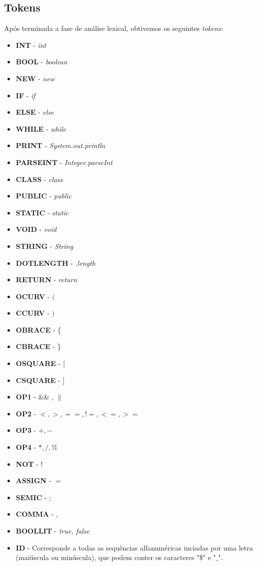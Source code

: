 \documentclass[11pt,a4paper]{article}
\begin{document}
\subsection{Tokens}

Após terminada a fase de análise lexical, obtivemos os seguintes \textit{tokens}:

\begin{itemize}
	\item \textbf{INT} - \textit{int} 
	\item \textbf{BOOL} - \textit{boolean}
	\item \textbf{NEW} - \textit{new}
	\item \textbf{IF} - \textit{if}
	\item \textbf{ELSE} - \textit{else}
	\item \textbf{WHILE} - \textit{while}
	\item \textbf{PRINT} - \textit{System.out.println}
	\item \textbf{PARSEINT} - \textit{Integer.parseInt}
	\item \textbf{CLASS} - \textit{class}
	\item \textbf{PUBLIC} - \textit{public}
	\item \textbf{STATIC} - \textit{static}
	\item \textbf{VOID} - \textit{void}
	\item \textbf{STRING} - \textit{String}
	\item \textbf{DOTLENGTH} - \textit{.length}
	\item \textbf{RETURN} - \textit{return}
	\item \textbf{OCURV} - $($
	\item \textbf{CCURV} - $)$
	\item \textbf{OBRACE} - \{
	\item \textbf{CBRACE} - \}
	\item \textbf{OSQUARE} - [
	\item \textbf{CSQUARE} - ]
	\item \textbf{OP1} - \&\& , $\|$
	\item \textbf{OP2} - $< , > , == , != , <= , >=$
	\item \textbf{OP3} - $+ , -$
	\item \textbf{OP4} - $* , / , \% $
	\item \textbf{NOT} - !
	\item \textbf{ASSIGN} - $=$
	\item \textbf{SEMIC} - ;
	\item \textbf{COMMA} - ,
	\item \textbf{BOOLLIT} - \textit{true, false}
	\item \textbf{ID} - Corresponde a todas as sequências alfanuméricas inciadas por uma letra (maiúscula ou minúscula), que podem conter os caracteres "\$" e "$\_$".
\end{itemize}
\end{document}

